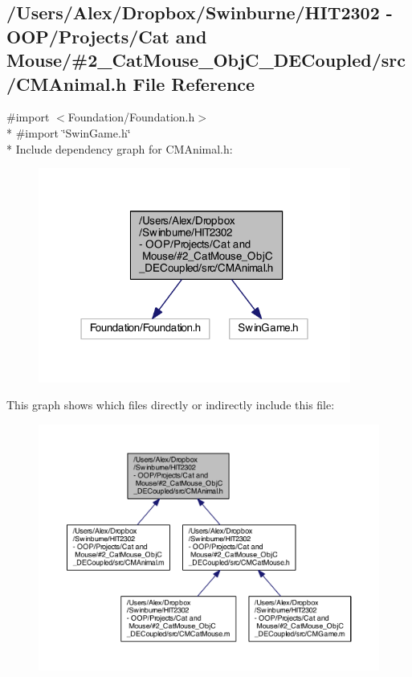 \subsection{/\-Users/\-Alex/\-Dropbox/\-Swinburne/\-H\-I\-T2302 -\/ O\-O\-P/\-Projects/\-Cat and Mouse/\#2\-\_\-\-Cat\-Mouse\-\_\-\-Obj\-C\-\_\-\-D\-E\-Coupled/src/\-C\-M\-Animal.h File Reference}
\label{_c_m_animal_8h}
{\ttfamily \#import $<$Foundation/\-Foundation.\-h$>$}\\*
{\ttfamily \#import \char`\"{}Swin\-Game.\-h\char`\"{}}\\*
Include dependency graph for C\-M\-Animal.\-h\-:
\nopagebreak
\begin{figure}[H]
\begin{center}
\leavevmode
\includegraphics[width=291pt]{_c_m_animal_8h__incl}
\end{center}
\end{figure}
This graph shows which files directly or indirectly include this file\-:
\nopagebreak
\begin{figure}[H]
\begin{center}
\leavevmode
\includegraphics[width=350pt]{_c_m_animal_8h__dep__incl}
\end{center}
\end{figure}
